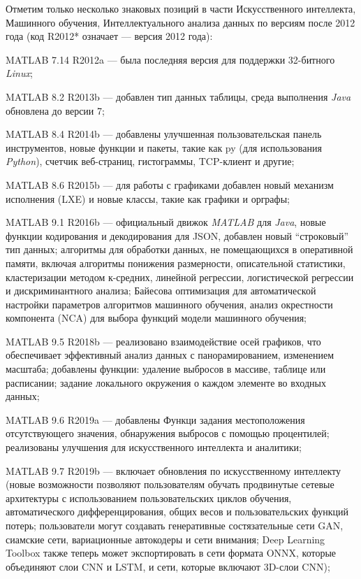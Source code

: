 Отметим только несколько знаковых позиций в части Искусственного интеллекта, Машинного обучения, Интеллектуального анализа данных по версиям после 2012 года (код R2012* означает --- версия 2012 года):
\begin{textitemize}
	\item MATLAB 7.14 R2012a --- была последняя версия для поддержки 32-битного \textit{Linux};
	\item MATLAB 8.2 R2013b --- добавлен тип данных таблицы, среда выполнения \textit{Java} обновлена до версии 7;
	\item MATLAB 8.4 R2014b --- добавлены улучшенная пользовательская панель инструментов, новые функции и пакеты, такие как py (для использования \textit{Python}), счетчик веб-страниц, гистограммы, TCP-клиент и другие;
	\item MATLAB 8.6 R2015b --- для работы с графиками добавлен новый механизм исполнения (LXE) и новые классы, такие как графики и орграфы;
	\item MATLAB 9.1 R2016b --- официальный движок \textit{MATLAB} для \textit{Java}, новые функции кодирования и декодирования для JSON, добавлен новый ``строковый'' тип данных; алгоритмы для обработки данных, не помещающихся в оперативной памяти, включая алгоритмы понижения размерности, описательной статистики, кластеризации методом к-средних, линейной регрессии, логистической регрессии и дискриминантного анализа; Байесова оптимизация для автоматической настройки параметров алгоритмов машинного обучения, анализ окрестности компонента (NCA) для выбора функций модели машинного обучения;
	\item MATLAB 9.5 R2018b --- реализовано взаимодействие осей графиков, что обеспечивает эффективный анализ данных с панорамированием, изменением масштаба; добавлены функции: удаление выбросов в массиве, таблице или расписании; задание локального окружения о каждом элементе во входных данных; 
	\item MATLAB 9.6 R2019a --- добавлены Функци задания местоположения отсутствующего значения, обнаружения выбросов с помощью процентилей; реализованы улучшения для искусственного интеллекта и аналитики; 
	\item MATLAB 9.7 R2019b --- включает обновления по искусственному интеллекту (новые возможности позволяют пользователям обучать продвинутые сетевые архитектуры с использованием пользовательских циклов обучения, автоматического дифференцирования, общих весов и пользовательских функций потерь; пользователи могут создавать генеративные состязательные сети GAN, сиамские сети, вариационные автокодеры и сети внимания; Deep Learning Toolbox также теперь может экспортировать в сети формата ONNX, которые объединяют слои CNN и LSTM, и сети, которые включают 3D-слои CNN); 

\end{textitemize}
